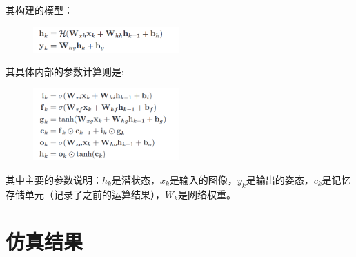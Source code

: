 其构建的模型：
\begin{figure}[H]
	\centering
	\includegraphics[width=0.5\textwidth]{images/deepvo/fuc1.png}
\end{figure}

其具体内部的参数计算则是:
\begin{figure}[H]
	\centering
	\includegraphics[width=0.5\textwidth]{images/deepvo/fuc2.png}
\end{figure}

其中主要的参数说明：$h_k$是潜状态，$x_k$是输入的图像，$y_k$是输出的姿态，$c_k$是记忆存储单元（记录了之前的运算结果），$W_k$是网络权重。

\section{仿真结果}

